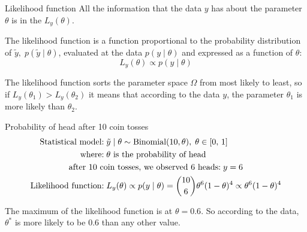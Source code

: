 \begin{definition}{Likelihood function}{}{}
	All the information that the data $y$ has about the parameter $\theta$ is in the
	 $L_y(\theta)$.

	The likelihood function is a function proportional to the probability distribution
	of $\tilde{y},\; p(\tilde{y}\mid\theta)$, evaluated at the data $p(y \mid \theta)$
	and expressed as a function of $\theta$:
	\begin{equation}
		L_y(\theta) \propto p(y \mid \theta)
	\end{equation}
\end{definition}

The likelihood function sorts the parameter space $\Omega$ from most likely to least,
so if $L_y(\theta_1) > L_y(\theta_2)$ it means that according to the data $y$,
the parameter $\theta_1$ is more likely than $\theta_2$.

\begin{example}{Probability of head after 10 coin tosses}{}
	\begin{alignat*}{1}
		\text{Statistical model:}   & \; \tilde y \mid \theta \sim \text{Binomial}(10, \theta), \; \theta \in [0,\,1] \\
		\text{where:}               & \; \theta \text{ is the probability of head}                                    \\
		\span \text{after 10 coin tosses, we observed 6 heads:} \; y = 6                                              \\
		\text{Likelihood function:} & \; L_y(\theta) \propto p(y \mid \theta) = \binom{10}{6} \theta^6 (1-\theta)^4
		\propto \theta^6 (1-\theta)^4
	\end{alignat*}
	\begin{nscenter}
	\end{nscenter}
	The maximum of the likelihood function is at $\theta = 0.6$. So according to the data,
	$\theta^*$ is more likely to be 0.6 than any other value.
\end{example}

